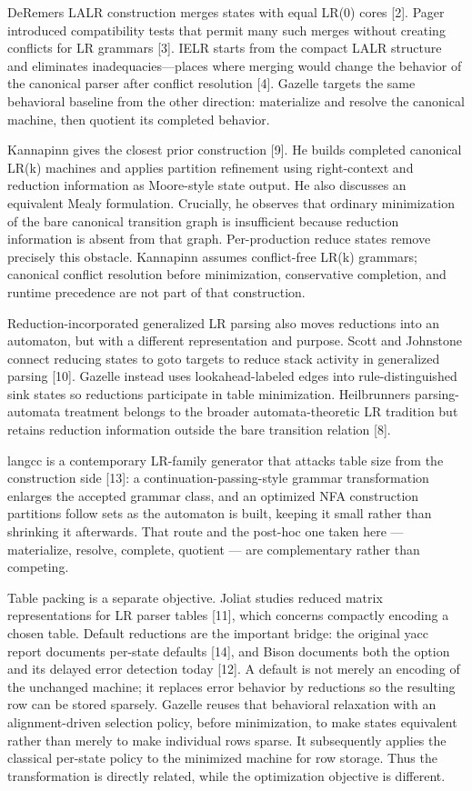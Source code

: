 \documentclass[
  10pt,
]{article}
\begin{document}
DeRemer\textquotesingle s LALR construction merges states with equal
LR(0) cores {[}2{]}. Pager introduced compatibility tests that permit
many such merges without creating conflicts for LR grammars {[}3{]}.
IELR starts from the compact LALR structure and eliminates
inadequacies---places where merging would change the behavior of the
canonical parser after conflict resolution {[}4{]}. Gazelle targets the
same behavioral baseline from the other direction: materialize and
resolve the canonical machine, then quotient its completed behavior.

Kannapinn gives the closest prior construction {[}9{]}. He builds
completed canonical LR(k) machines and applies partition refinement
using right-context and reduction information as Moore-style state
output. He also discusses an equivalent Mealy formulation. Crucially, he
observes that ordinary minimization of the bare canonical transition
graph is insufficient because reduction information is absent from that
graph. Per-production reduce states remove precisely this obstacle.
Kannapinn assumes conflict-free LR(k) grammars; canonical conflict
resolution before minimization, conservative completion, and runtime
precedence are not part of that construction.

Reduction-incorporated generalized LR parsing also moves reductions into
an automaton, but with a different representation and purpose. Scott and
Johnstone connect reducing states to goto targets to reduce stack
activity in generalized parsing {[}10{]}. Gazelle instead uses
lookahead-labeled edges into rule-distinguished sink states so
reductions participate in table minimization.
Heilbrunner\textquotesingle s parsing-automata treatment belongs to the
broader automata-theoretic LR tradition but retains reduction
information outside the bare transition relation {[}8{]}.

langcc is a contemporary LR-family generator that attacks table size
from the construction side {[}13{]}: a continuation-passing-style
grammar transformation enlarges the accepted grammar class, and an
optimized NFA construction partitions follow sets as the automaton is
built, keeping it small rather than shrinking it afterwards. That route
and the post-hoc one taken here --- materialize, resolve, complete,
quotient --- are complementary rather than competing.

Table packing is a separate objective. Joliat studies reduced matrix
representations for LR parser tables {[}11{]}, which concerns compactly
encoding a chosen table. Default reductions are the important bridge:
the original yacc report documents per-state defaults {[}14{]}, and
Bison documents both the option and its delayed error detection today
{[}12{]}. A default is not merely an encoding of the unchanged machine;
it replaces error behavior by reductions so the resulting row can be
stored sparsely. Gazelle reuses that behavioral relaxation with an
alignment-driven selection policy, before minimization, to make states
equivalent rather than merely to make individual rows sparse. It
subsequently applies the classical per-state policy to the minimized
machine for row storage. Thus the transformation is directly related,
while the optimization objective is different.
\end{document}
